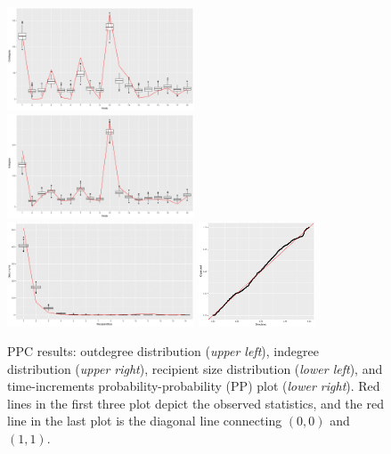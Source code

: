 \documentclass[12pt]{article}
\begin{document}
	\begin{figure}[!t]
		\centering
		\includegraphics[width=0.495\textwidth]{plots_paper/outdegreenew-1.png}	
		\includegraphics[width=0.495\textwidth]{plots_paper/indegreenew-1.png}	
		\includegraphics[width=0.495\textwidth]{plots_paper/recipientsizenew-1.png}	
		\includegraphics[width=0.31\textwidth]{plots_paper/timeppnew.pdf}
		\caption {PPC results: outdegree distribution (\textit{upper left}), indegree distribution (\textit{upper right}), recipient size distribution (\textit{lower left}), and time-increments probability-probability (PP) plot  (\textit{lower right}). Red lines in the first three plot depict the observed statistics, and the red line in the last plot is the diagonal line connecting $(0, 0)$ and $(1, 1)$.}
		\label{figure:PPCresults}
	\end{figure}
\end{document}
